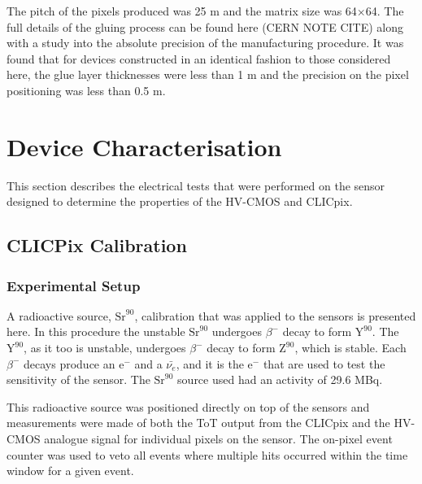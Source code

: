 The pitch of the pixels produced was 25 {\mu}m and the matrix size was 64$\times$64.  The full details of the gluing process can be found here (CERN NOTE CITE) along with a study into the absolute precision of the manufacturing procedure.  It was found that for devices constructed in an identical fashion to those considered here, the glue layer thicknesses were less than 1 {\mu}m and the precision on the pixel positioning was less than 0.5 {\mu}m.  


\section{Device Characterisation}

This section describes the electrical tests that were performed on the sensor designed to determine the properties of the HV-CMOS and CLICpix.  


\subsection{CLICPix Calibration}

\subsubsection{Experimental Setup}
A radioactive source, $\text{Sr}^{90}$, calibration that was applied to the sensors is presented here.  In this procedure the unstable $\text{Sr}^{90}$ undergoes $\beta^{-}$ decay to form $\text{Y}^{90}$.  The $\text{Y}^{90}$, as it too is unstable, undergoes $\beta^{-}$ decay to form $\text{Z}^{90}$, which is stable.  Each $\beta^{-}$ decays produce an $\text{e}^{-}$ and a $\bar{\nu_{e}}$, and it is the $\text{e}^{-}$ that are used to test the sensitivity of the sensor.  The $\text{Sr}^{90}$ source used had an activity of 29.6 MBq.  

This radioactive source was positioned directly on top of the sensors and measurements were made of both the ToT output from the CLICpix and the HV-CMOS analogue signal for individual pixels on the sensor.  The on-pixel event counter was used to veto all events where multiple hits occurred within the time window for a given event.  

